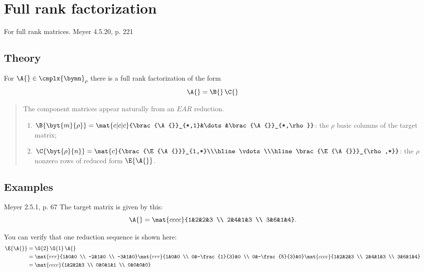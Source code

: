 \section[$\pee{}\A{}=\B{}\C{}$]{Full rank factorization}
For full rank matrices. Meyer 4.5.20, p. 221

\subsection{Theory}
For $\A{}\in\cmplx{\bymn}_{\rho}$ there is a full rank factorization of the form
\begin{equation}
  \A{}=\B{}\,\C{}
\end{equation}
\begin{quote}
The component matrices appear naturally from an $EAR$ reduction.
\begin{enumerate}
\item $\B{\byt{m}{\rho}} = \mat{c|c|c}{\brac{\A{}}_{*,1}&\dots&\brac{\A{}}_{*,\rho}}$: the $\rho$ basic columns of the target matrix;
\item $\C{\byt{\rho}{n}} = \mat{c}{\brac{\E{\A{}}}_{1,*}\\\hline\vdots\\\hline\brac{\E{\A{}}}_{\rho,*}}$: the $\rho$ nonzero rows of reduced form $\E{\A{}}$.
\end{enumerate}

\end{quote}

\subsection{Examples}
Meyer 2.5.1, p. 67
The target matrix is given by this:
\begin{equation}
  \A{} = \mat{cccc}{1&2&2&3 \\ 2&4&1&3 \\ 3&6&1&4}.
\end{equation}

You can verify that one reduction sequence is shown here:
\begin{equation}
\begin{split}
  \E{\A{}} &= \G{2}\,\G{1}\,\A{}\\
 & =
\mat{rrr}{1&0&0 \\ -2&1&0 \\ -3&1&0}
\mat{rrr}{1&0&0 \\ 0&-\frac{1}{3}&0 \\ 0&-\frac{5}{3}&0}
\mat{cccc}{1&2&2&3 \\ 2&4&1&3 \\ 3&6&1&4} \\
   &= 
\mat{cccc}{1&2&2&3 \\ 0&0&1&1 \\ 0&0&0&0}
\end{split}
\end{equation}

